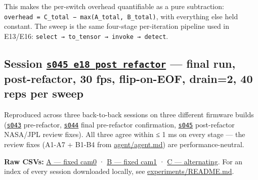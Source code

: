 This makes the per-switch overhead quantifiable as a pure subtraction:
\texttt{overhead\ =\ C\_total\ −\ max(A\_total,\ B\_total)}, with
everything else held constant. The sweep is the same four-stage
per-iteration pipeline used in E13/E16:
\texttt{select\ →\ to\_tensor\ →\ invoke\ →\ detect}.

\subsection{\texorpdfstring{Session
\href{../experiments/s045_e18_post_refactor/}{\texttt{s045\_e18\_post\_refactor}}
--- final run, post-refactor, 30 fps, flip-on-EOF, drain=2, 40 reps per
sweep}{Session s045\_e18\_post\_refactor --- final run, post-refactor, 30 fps, flip-on-EOF, drain=2, 40 reps per sweep}}\label{session-s045_e18_post_refactor-final-run-post-refactor-30-fps-flip-on-eof-drain2-40-reps-per-sweep}

Reproduced across three back-to-back sessions on three different
firmware builds
(\href{../experiments/s043_e18_headtail_drain2/}{\texttt{s043}}
pre-refactor,
\href{../experiments/s044_e18_headtail_drain2/}{\texttt{s044}} final
pre-refactor confirmation,
\href{../experiments/s045_e18_post_refactor/}{\texttt{s045}}
post-refactor NASA/JPL review fixes). All three agree within ≤ 1 ms on
every stage --- the review fixes (A1-A7 + B1-B4 from
\href{../agent/agent.md}{agent/agent.md}) are performance-neutral.

\textbf{Raw CSVs:}
\href{../experiments/s045_e18_post_refactor/001_e18_A_fixed_cam0.csv}{A
--- fixed cam0} ·
\href{../experiments/s045_e18_post_refactor/002_e18_B_fixed_cam1.csv}{B
--- fixed cam1} ·
\href{../experiments/s045_e18_post_refactor/003_e18_C_alt_cam0_cam1.csv}{C
--- alternating}. For an index of every session downloaded locally, see
\href{../experiments/README.md}{experiments/README.md}.

